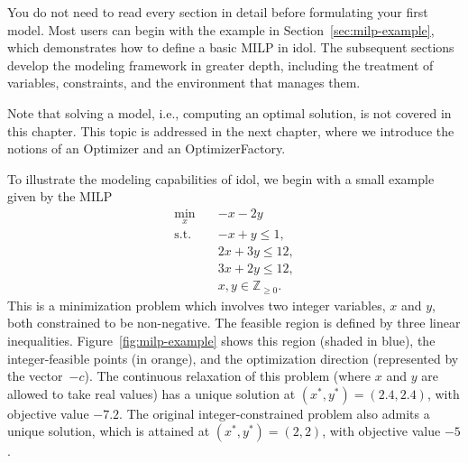 \begin{remark}
    You do not need to read every section in detail before formulating your
    first model. Most users can begin with the example in
    Section~\ref{sec:milp-example}, which demonstrates how to define a basic
    MILP in \textsf{idol}. The subsequent sections develop the modeling
    framework in greater depth, including the treatment of variables,
    constraints, and the environment that manages them.

    Note that solving a model, i.e., computing an optimal solution, is not
    covered in this chapter. This topic is addressed in the next chapter,
    where we introduce the notions of an \textsf{Optimizer} and an
    \textsf{OptimizerFactory}.
\end{remark}

\label{sec:milp-example}

To illustrate the modeling capabilities of \textsf{idol}, we begin with a
small example given by the MILP
\begin{subequations}
    \label{eq:milp-example}
    \begin{align}
        \min_x \quad & -x - 2y \\
        \text{s.t.} \quad & -x + y \le 1, \\
        & 2x + 3y \le 12, \\
        & 3x + 2y \le 12, \\
        & x,y\in\mathbb{Z}_{\ge 0}.
    \end{align}
\end{subequations}
This is a minimization problem which involves two integer variables, $x$ and
$y$, both constrained to be non-negative. The feasible region is defined by
three linear inequalities. Figure~\ref{fig:milp-example} shows this region
(shaded in blue), the integer-feasible points (in orange), and the
optimization direction (represented by the vector~$-c$). 
%
The continuous relaxation of this problem (where $x$ and $y$ are allowed to
take real values) has a unique solution at $(x^*, y^*) = (2.4, 2.4)$, with
objective value $-7.2$. The original integer-constrained problem also admits a
unique solution, which is attained at $(x^*, y^*) = (2, 2)$, with objective
value $-5$.

\newcommand{\drawPoint}[2]{\filldraw[my-orange] (#1,#2) circle (1.5pt) node[anchor=north west] {};}

